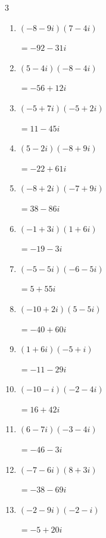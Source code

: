 \begin{multicols}{3}
\begin{enumerate}
  \item $\displaystyle (-8-9i)(7-4i)$

        $\displaystyle =-92-31i$

  \item $\displaystyle (5-4i)(-8-4i)$

        $\displaystyle =-56+12i$

  \item $\displaystyle (-5+7i)(-5+2i)$

        $\displaystyle =11-45i$

  \item $\displaystyle (5-2i)(-8+9i)$

        $\displaystyle =-22+61i$

  \item $\displaystyle (-8+2i)(-7+9i)$

        $\displaystyle =38-86i$

\columnbreak %

\resetques

  \item $\displaystyle (-1+3i)(1+6i)$

        $\displaystyle =-19-3i$

  \item $\displaystyle (-5-5i)(-6-5i)$

        $\displaystyle =5+55i$

  \item $\displaystyle (-10+2i)(5-5i)$

        $\displaystyle =-40+60i$

  \item $\displaystyle (1+6i)(-5+i)$

        $\displaystyle =-11-29i$

  \item $\displaystyle (-10-i)(-2-4i)$

        $\displaystyle =16+42i$

  \item $\displaystyle (6-7i)(-3-4i)$

        $\displaystyle =-46-3i$

  \item $\displaystyle (-7-6i)(8+3i)$

        $\displaystyle =-38-69i$

  \item $\displaystyle (-2-9i)(-2-i)$

        $\displaystyle =-5+20i$


\end{enumerate}
\end{multicols}
